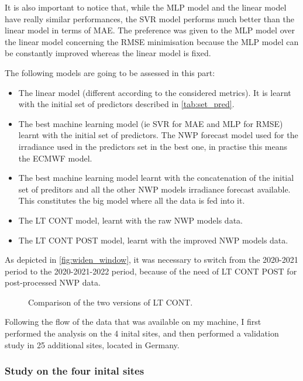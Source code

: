It is also important to notice that, while the MLP model and the linear model have really similar performances, the SVR model performs much better than the linear model in terms of MAE.
The preference was given to the MLP model over the linear model concerning the RMSE minimisation because the MLP model can be constantly improved whereas the linear model is fixed.

The following models are going to be assessed in this part:
\begin{itemize}
    \item The linear model (different according to the considered metrics). It is learnt with the initial set of predictors described in \autoref{tab:set_pred}.
    \item The best machine learning model (ie SVR for MAE and MLP for RMSE) learnt with the initial set of predictors. The NWP forecast model used for the irradiance used in the predictors set in the best one, in practise this means the ECMWF model.
    \item The best machine learning model learnt with the concatenation of the initial set of preditors and all the other NWP models irradiance forecast available. This constitutes the big model where all the data is fed into it.
    \item The LT CONT model, learnt with the raw NWP models data.
    \item The LT CONT POST model, learnt with the improved NWP models data.
\end{itemize}

As depicted in \autoref{fig:widen_window}, it was necessary to switch from the 2020-2021 period to the 2020-2021-2022 period, because of the need of LT CONT POST for post-processed NWP data.
\newpage
\begin{figure}[htb!]
    \centering
    
\caption{Comparison of the two versions of LT CONT.}
\label{fig:widen_window}
\end{figure}

Following the flow of the data that was available on my machine, I first performed the analysis on the 4 inital sites, and then performed a validation study in 25 additional sites, located in Germany.

\newpage
\subsubsection{Study on the four inital sites}
\label{sec:initial_study}
